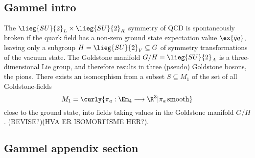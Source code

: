 \documentclass{article}
\begin{document}
\subsection*{Gammel intro}
The $\lieg{SU}{2}_L \times \lieg{SU}{2}_R$ symmetry of QCD is spontaneously broken if the quark field has a non-zero ground state expectation value $\ex{\bar q q}$, leaving only a subgroup $H = \lieg{SU}{2}_V \subseteq G$ of symmetry transformations of the vacuum state.
The Goldstone manifold $G/H = \lieg{SU}{2}_A$ is a three-dimensional Lie group, and therefore results in three (pseudo) Goldstone bosons, the pions.
There exists an isomorphism from a subset $S \subseteq M_1$ of the set of all Goldstone-fields
\begin{equation*}
    M_1 = \curly{ \pi_a: \Em_4 \longrightarrow \R^3 | \pi_a \, \mathrm{smooth} }
\end{equation*}
close to the ground state, into fields taking values in the Goldstone manifold $G/H$. (BEVISE?)(HVA ER ISOMORFISME HER?).


\subsection*{Gammel appendix section}
\end{document}
